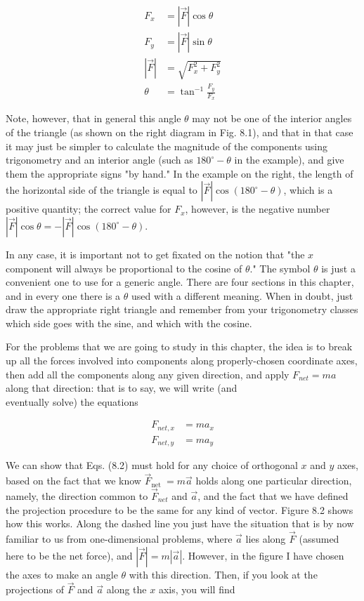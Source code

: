 \documentclass[10pt]{article}
\begin{document}
\begin{align*}
F_{x} & =|\vec{F}| \cos \theta \\
F_{y} & =|\vec{F}| \sin \theta \\
|\vec{F}| & =\sqrt{F_{x}^{2}+F_{y}^{2}} \\
\theta & =\tan ^{-1} \frac{F_{y}}{F_{x}} \tag{8.1}
\end{align*}


Note, however, that in general this angle $\theta$ may not be one of the interior angles of the triangle (as shown on the right diagram in Fig. 8.1), and that in that case it may just be simpler to calculate the magnitude of the components using trigonometry and an interior angle (such as $180^{\circ}-\theta$ in the example), and give them the appropriate signs "by hand." In the example on the right, the length of the horizontal side of the triangle is equal to $|\vec{F}| \cos \left(180^{\circ}-\theta\right)$, which is a positive quantity; the correct value for $F_{x}$, however, is the negative number $|\vec{F}| \cos \theta=-|\vec{F}| \cos \left(180^{\circ}-\theta\right)$.

In any case, it is important not to get fixated on the notion that "the $x$ component will always be proportional to the cosine of $\theta$." The symbol $\theta$ is just a convenient one to use for a generic angle. There are four sections in this chapter, and in every one there is a $\theta$ used with a different meaning. When in doubt, just draw the appropriate right triangle and remember from your trigonometry classes which side goes with the sine, and which with the cosine.

For the problems that we are going to study in this chapter, the idea is to break up all the forces involved into components along properly-chosen coordinate axes, then add all the components along any given direction, and apply $F_{n e t}=m a$ along that direction: that is to say, we will write (and\\
eventually solve) the equations


\begin{align*}
F_{n e t, x} & =m a_{x} \\
F_{n e t, y} & =m a_{y} \tag{8.2}
\end{align*}


We can show that Eqs. (8.2) must hold for any choice of orthogonal $x$ and $y$ axes, based on the fact that we know $\vec{F}_{\text {net }}=m \vec{a}$ holds along one particular direction, namely, the direction common to $\vec{F}_{n e t}$ and $\vec{a}$, and the fact that we have defined the projection procedure to be the same for any kind of vector. Figure 8.2 shows how this works. Along the dashed line you just have the situation that is by now familiar to us from one-dimensional problems, where $\vec{a}$ lies along $\vec{F}$ (assumed here to be the net force), and $|\vec{F}|=m|\vec{a}|$. However, in the figure I have chosen the axes to make an angle $\theta$ with this direction. Then, if you look at the projections of $\vec{F}$ and $\vec{a}$ along the $x$ axis, you will find
\end{document}
